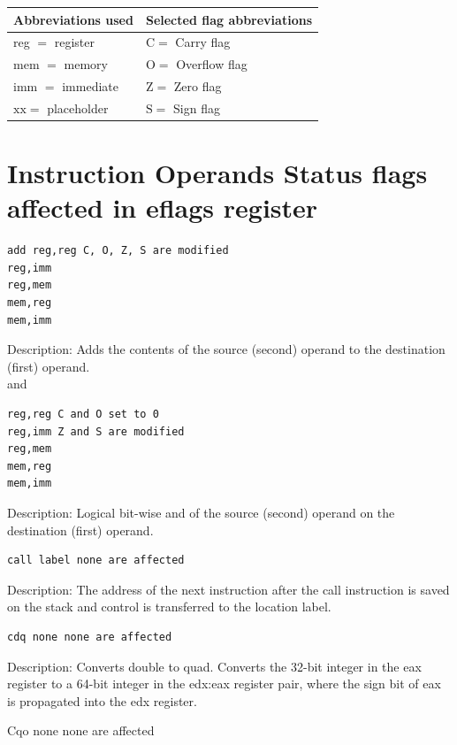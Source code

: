 \documentclass[10pt]{article}
\begin{document}
\begin{center}
\begin{tabular}{|l|l|}
\hline
Abbreviations used & Selected flag abbreviations \\
\hline
reg $=$ register & $\mathrm{C}=$ Carry flag \\
\hline
mem $=$ memory & $\mathrm{O}=$ Overflow flag \\
\hline
imm $=$ immediate & $\mathrm{Z}=$ Zero flag \\
\hline
$\mathrm{xx}=$ placeholder & $\mathrm{S}=$ Sign flag \\
\hline
\end{tabular}
\end{center}

\section*{Instruction Operands Status flags affected in eflags register}
\begin{verbatim}
add reg,reg C, O, Z, S are modified
reg,imm
reg,mem
mem,reg
mem,imm
\end{verbatim}

Description: Adds the contents of the source (second) operand to the destination (first) operand.\\
and

\begin{verbatim}
reg,reg C and O set to 0
reg,imm Z and S are modified
reg,mem
mem,reg
mem,imm
\end{verbatim}

Description: Logical bit-wise and of the source (second) operand on the destination (first) operand.

\begin{verbatim}
call label none are affected
\end{verbatim}

Description: The address of the next instruction after the call instruction is saved on the stack and control is transferred to the location label.

\begin{verbatim}
cdq none none are affected
\end{verbatim}

Description: Converts double to quad. Converts the 32-bit integer in the eax register to a 64-bit integer in the edx:eax register pair, where the sign bit of eax is propagated into the edx register.

Cqo none none are affected
\end{document}
